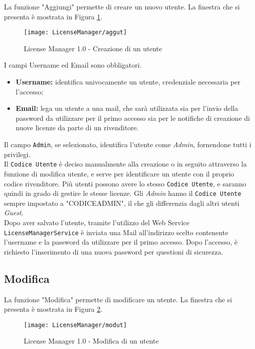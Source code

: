 La funzione "Aggiungi" permette di creare un nuovo utente. La finestra che si presenta è mostrata in Figura \ref{agg}.

\begin{figure}[!h] 
    \centering 
    \texttt{[image: LicenseManager/aggut]} 
    \caption{License Manager 1.0 - Creazione di un utente}
\label{agg}

\end{figure}

I campi Username ed Email sono obbligatori.
\begin{itemize}
\item \textbf{Username:} identifica univocamente un utente, credenziale necessaria per l’accesso;
\item \textbf{Email:} lega un utente a una mail, che sarà utilizzata sia per l’invio della password da utilizzare per il primo accesso sia per le notifiche di creazione di nuove licenze da parte di un rivenditore.
\end{itemize}
Il campo \texttt{Admin}, se selezionato, identifica l’utente come \textit{Admin}, fornendone tutti i privilegi.\\
Il \texttt{Codice Utente} è deciso manualmente alla creazione o in seguito attraverso la funzione di modifica utente, e serve per identificare un utente con il proprio codice rivenditore. Più utenti possono avere lo stesso \texttt{Codice Utente}, e saranno quindi in grado di gestire le stesse licenze. Gli \textit{Admin} hanno il \texttt{Codice Utente} sempre impostato a "CODICEADMIN", il che gli differenzia dagli altri utenti \textit{Guest}.\\
Dopo aver salvato l’utente, tramite l'utilizzo del Web Service \texttt{LicenseManagerService} è inviata una Mail all’indirizzo scelto contenente l’username e la password da utilizzare per il primo accesso. Dopo l’accesso, è richiesto l’inserimento di una nuova password per questioni di sicurezza.


\subsection{Modifica}

La funzione "Modifica" permette di modificare un utente. La finestra che si presenta è mostrata in Figura \ref{mod}.

\begin{figure}[!h] 
    \centering 
    \texttt{[image: LicenseManager/modut]} 
    \caption{License Manager 1.0 - Modifica di un utente}
\label{mod}

\end{figure}

